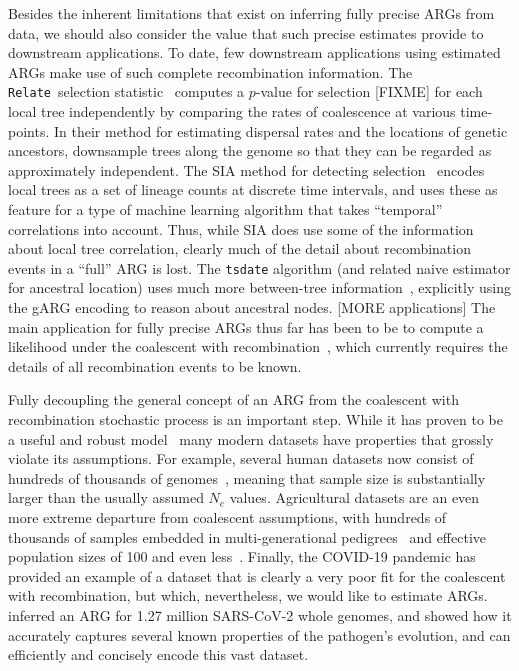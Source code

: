 \documentclass{article}
\newcommand{\relate}[0]{\texttt{Relate}}
\begin{document}
Besides the inherent limitations that exist on inferring fully precise ARGs
from data,
we should also consider the value that such precise estimates provide
to downstream applications.
To date, few downstream applications using estimated ARGs
make use of such complete recombination information.
The \relate\ selection statistic~\citep{speidel2019method}
computes a $p$-value for selection [FIXME] for each
local tree independently by comparing the rates of coalescence
at various time-points.
In their method
for estimating dispersal rates and the locations of genetic
ancestors,
\citep{osmond2021estimating} downsample trees along the genome
so that they can be regarded as approximately independent.
The SIA method for detecting selection~\citep{hejase2022deep}
encodes local trees as a set of lineage counts at discrete
time intervals, and uses these as feature for a
type of machine learning algorithm
that takes ``temporal'' correlations into account. Thus,
while SIA does use some of the information about local tree correlation,
clearly much of the detail about recombination
events in a ``full'' ARG is lost.
The \texttt{tsdate} algorithm (and related naive estimator
for ancestral location) uses much more between-tree
information~\citep{wohns2022unified}, explicitly using the gARG
encoding to reason about ancestral nodes.
[MORE applications]
The main application for fully precise ARGs thus far has been
to be to compute a likelihood under the coalescent with
recombination~\citep[e.g.][]{kuhner2000maximum,mahmoudi2022bayesian},
which currently requires the details of all recombination
events to be known.

Fully decoupling the general concept of an ARG from the coalescent
with recombination stochastic process is an important step.
While it has proven to be a useful and
robust model~\citep{wakeley2012gene,bhaskar2014distortion,nelson2020accounting}
many modern datasets have properties that grossly
violate its assumptions.
For example, several human datasets now consist of hundreds of thousands of
genomes~\citep{bycroft2018genome,karczewski2020mutational,tanjo2021practical},
meaning that sample size is substantially larger than the
usually assumed $N_e$ values.
Agricultural datasets are an even more extreme departure from coalescent
assumptions, with hundreds of thousands of samples embedded in
multi-generational pedigrees~\citep{hayes20191000,Ros-Freixedes2020}
and effective population sizes of 100 and even
less~\citep{MacLeod2013,Makanjuola2020,Hall2016,Porcnic2016}.
Finally, the COVID-19 pandemic has provided an example of a dataset that
is clearly a very poor fit for the coalescent with recombination, but which,
nevertheless, we would like to estimate ARGs.
\cite{zhan2023towards} inferred an ARG for 1.27 million SARS-CoV-2 whole
genomes, and showed how it accurately captures several known properties of
the pathogen's evolution, and can efficiently and concisely
encode this vast dataset.
\end{document}
